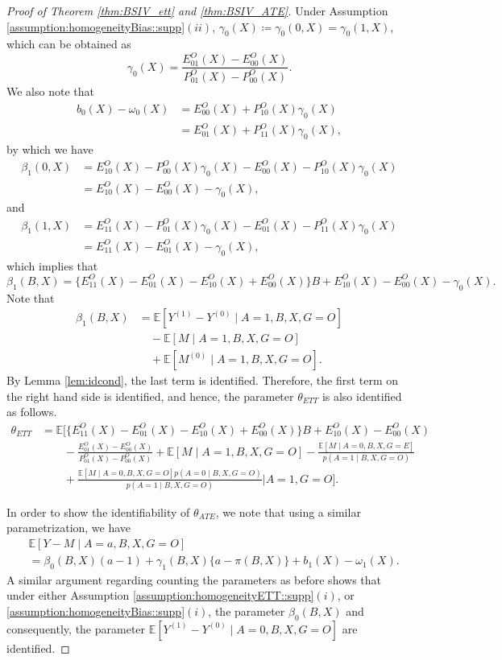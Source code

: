 \documentclass[10pt]{article}
\newcommand{\E}{\mathbb{E}}
\begin{document}
\begin{proof}[Proof of Theorem \ref{thm:BSIV_ett} and \ref{thm:BSIV_ATE}]
Under Assumption \ref{assumption:homogeneityBias::supp}$(ii)$, $\gamma_0(X)\coloneqq\gamma_0(0,X)=\gamma_0(1,X)$, which can be obtained as 
\[
\gamma_0(X)=\frac{E_{01}^O(X)-E_{00}^O(X)}{P_{01}^O(X)-P_{00}^O(X)}.
\]
We also note that
\begin{align*}
b_0(X)-\omega_0(X)
&=E_{00}^O(X)+P_{10}^O(X)\gamma_0(X)\\
&=E_{01}^O(X)+P_{11}^O(X)\gamma_0(X),
\end{align*}
by which we have
\begin{align*}
\beta_1(0,X)
&=E_{10}^O(X)-P_{00}^O(X)\gamma_0(X)-E_{00}^O(X)-P_{10}^O(X)\gamma_0(X)\\
&=E_{10}^O(X)-E_{00}^O(X)-\gamma_0(X),
\end{align*}
and	
\begin{align*}
\beta_1(1,X)
&=E_{11}^O(X)-P_{01}^O(X)\gamma_0(X)-E_{01}^O(X)-P_{11}^O(X)\gamma_0(X)\\
&=E_{11}^O(X)-E_{01}^O(X)-\gamma_0(X),
\end{align*}	
which implies that
\[
\beta_1(B,X)=\{E_{11}^O(X)-E_{01}^O(X)-E_{10}^O(X)+E_{00}^O(X)\}B+E_{10}^O(X)-E_{00}^O(X)-\gamma_0(X).
\]
Note that
\begin{align*}
\beta_1(B,X)
&=\E[Y^{(1)}-Y^{(0)}\mid A=1,B,X,G=O]\\
&\quad-\E[M\mid A=1,B,X,G=O]\\
&\quad+\E[M^{(0)}\mid A=1,B,X,G=O].
\end{align*}	
By Lemma \ref{lem:idcond}, the last term is identified. Therefore, the first term on the right hand side is identified, and hence, the parameter $\theta_{ETT}$ is also identified as follows.
\begin{align*}
\theta_{ETT}
&=\E\Big[
\{E_{11}^O(X)-E_{01}^O(X)-E_{10}^O(X)+E_{00}^O(X)\}B+E_{10}^O(X)-E_{00}^O(X)\\
&\qquad-\frac{E_{01}^O(X)-E_{00}^O(X)}{P_{01}^O(X)-P_{00}^O(X)}+\E[M\mid A=1,B,X,G=O]-\frac{\E[M\mid A=0,B,X,G=E]}{p(A=1\mid B,X,G=O)}\\
&\qquad+\frac{\E[M\mid A=0,B,X,G=O]p(A=0\mid B,X,G=O)}{p(A=1\mid B,X,G=O)}\Big|A=1,G=O\Big].
\end{align*}
	
	

In order to show the identifiability of $\theta_{ATE}$, we note that using a similar parametrization, we have
\begin{align*}
&\E[Y-M\mid A=a,B,X,G=O]\\
&=\beta_0(B,X)(a-1)+\gamma_1(B,X)\{a-\pi(B,X)\}+b_1(X)-\omega_1(X).
\end{align*}
A similar argument regarding counting the parameters as before shows that under either Assumption \ref{assumption:homogeneityETT::supp}$(i)$, or \ref{assumption:homogeneityBias::supp}$(i)$,
	 the parameter $\beta_0(B,X)$ and consequently, the parameter $\E[Y^{(1)}-Y^{(0)}\mid A=0,B,X,G=O]$	 
	  are identified. 
	  

\end{proof}
\end{document}
